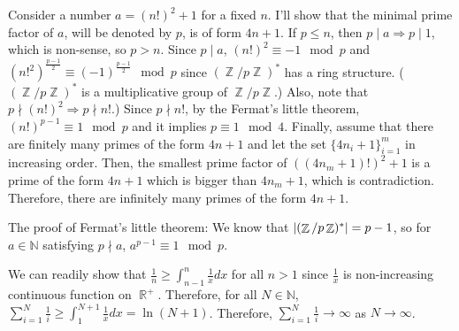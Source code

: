 \documentclass[12pt]{article}
\newenvironment{problem}[2][Problem]{\begin{trivlist}
\item[\hskip \labelsep {\bfseries #1}\hskip \labelsep {\bfseries #2.}]}{\end{trivlist}}
\DeclareMathOperator{\rr}{\mathbb{R}}
\DeclareMathOperator{\zz}{\mathbb{Z}}
\begin{document}
\begin{problem}{6}
\end{problem}
Consider a number $a=(n!)^2+1$ for a fixed $n$. I'll show that the minimal prime factor of $a$, will be denoted by $p$, is of form $4n+1$. If $p\leq n$, then $p\mid a\Rightarrow p\mid 1$, which is non-sense, so $p>n$. Since $p\mid a$, $(n!)^2\equiv -1\mod p$ and $(n!^2)^{\frac{p-1}{2}}\equiv (-1)^{\frac{p-1}{2}} \mod p$ since $(\zz/p\zz)^*$ has a ring structure. ($(\zz/p\zz)^*$ is a multiplicative group of $\zz/p\zz$.) Also, note that $p\nmid (n!)^2\Rightarrow p\nmid n!$.) Since $p\nmid n!$, by the Fermat's little theorem, $(n!)^{p-1}\equiv 1 \mod p$ and it implies $p \equiv 1 \mod 4$.
Finally, assume that there are finitely many primes of the form $4n+1$ and let the set $\{4n_i+1\}_{i=1}^m$ in increasing order. Then, the smallest prime factor of $((4n_m+1)!)^2+1$ is a prime of the form $4n+1$ which is bigger than $4n_m+1$, which is contradiction. Therefore, there are infinitely many primes of the form $4n+1$.

The proof of Fermat's little theorem: We know that $\abs{(\zz/p\zz)^*}=p-1$, so for $a\in \mathbb{N}$ satisfying $p\nmid a$, $a^{p-1}\equiv 1 \mod p$.

\begin{problem}{7}
\end{problem}
We can readily show that $\frac{1}{n}\geq \int_{n-1}^{n} \frac{1}{x} dx$ for all $n>1$ since $\frac{1}{x}$ is non-increasing continuous function on $\rr^+$. Therefore, for all $N\in \mathbb{N}$, $\sum\limits_{i=1}^N \frac{1}{i}\geq \int_1^{N+1}\frac{1}{x} dx=\ln(N+1)$. Therefore, $\sum\limits_{i=1}^N \frac{1}{i}\rightarrow \infty$ as $N\rightarrow \infty$.
\end{document}
